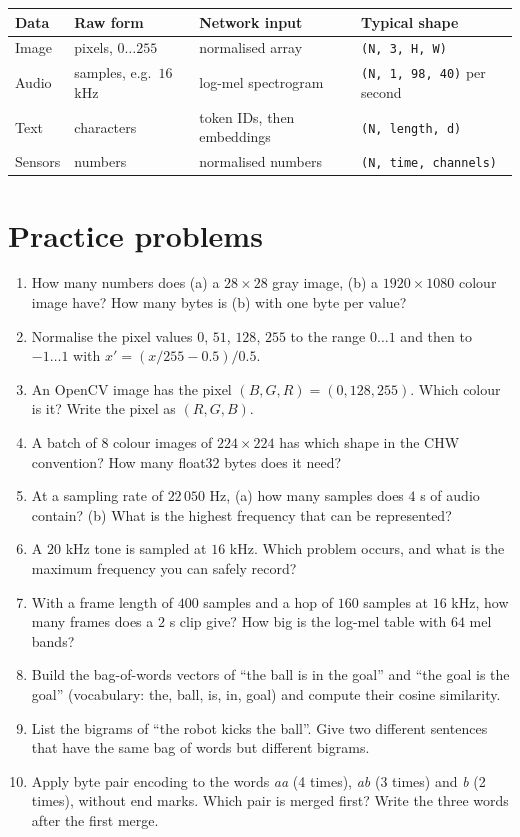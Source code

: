 \begin{center}
\renewcommand{\arraystretch}{1.3}
\begin{tabular}{p{2.0cm}p{4.4cm}p{3.5cm}p{3.7cm}}
\textbf{Data} & \textbf{Raw form} & \textbf{Network input} & \textbf{Typical shape}\\ \hline
Image & pixels, $0\ldots255$ & normalised array & \texttt{(N, 3, H, W)}\\
Audio & samples, e.g.\ $16$ kHz & log-mel spectrogram & \texttt{(N, 1, 98, 40)} per second\\
Text & characters & token IDs, then embeddings & \texttt{(N, length, d)}\\
Sensors & numbers & normalised numbers & \texttt{(N, time, channels)}\\
\end{tabular}
\end{center}

\section*{Practice problems}
\begin{enumerate}[label=\textbf{\thechapter.\arabic*}]
  \item How many numbers does (a) a $28\times28$ gray image, (b) a $1920\times1080$ colour image have? How many bytes is (b) with one byte per value?
  \item Normalise the pixel values $0$, $51$, $128$, $255$ to the range $0\ldots1$ and then to $-1\ldots1$ with $x'=(x/255-0.5)/0.5$.
  \item An OpenCV image has the pixel $(B,G,R)=(0,128,255)$. Which colour is it? Write the pixel as $(R,G,B)$.
  \item A batch of $8$ colour images of $224\times224$ has which shape in the CHW convention? How many float32 bytes does it need?
  \item At a sampling rate of $22\,050$ Hz, (a) how many samples does $4$ s of audio contain? (b) What is the highest frequency that can be represented?
  \item A $20$ kHz tone is sampled at $16$ kHz. Which problem occurs, and what is the maximum frequency you can safely record?
  \item With a frame length of $400$ samples and a hop of $160$ samples at $16$ kHz, how many frames does a $2$ s clip give? How big is the log-mel table with $64$ mel bands?
  \item Build the bag-of-words vectors of ``the ball is in the goal'' and ``the goal is the goal'' (vocabulary: the, ball, is, in, goal) and compute their cosine similarity.
  \item List the bigrams of ``the robot kicks the ball''. Give two different sentences that have the same bag of words but different bigrams.
  \item[\textbf{\thechapter.10}$\star$] Apply byte pair encoding to the words \emph{aa} (4 times), \emph{ab} (3 times) and \emph{b} (2 times), without end marks. Which pair is merged first? Write the three words after the first merge.
\end{enumerate}
